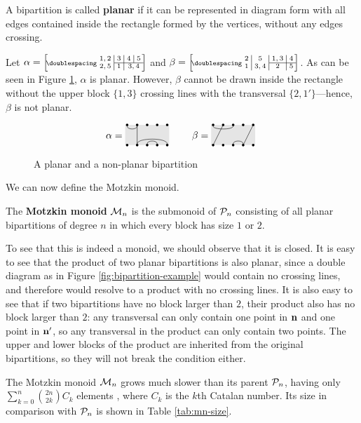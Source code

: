 \begin{definition}
  \label{def:planar}
  A bipartition is called \textbf{planar} if it can be represented in diagram
  form with all edges contained inside the rectangle formed by the vertices,
  without any edges crossing.
\end{definition}

\begin{example}
  Let $\alpha = \bipart{c|c|c|c}{2-4}{1,2 &3 &4 &5}{2,5 &1 &\mc2{c}{3,4}}$ and
  $\beta = \bipart{c|c|c|c}{3-4}{2 &5 &1,3 &4}{1 &3,4 &2 &5}$.  As can be seen
  in Figure \ref{fig:planar}, $\alpha$ is planar.  However, $\beta$ cannot be
  drawn inside the rectangle without the upper block $\{1,3\}$ crossing lines
  with the transversal $\{2, 1'\}$---hence, $\beta$ is not planar.
\end{example}

\begin{figure}[h]
  \centering
  $$\alpha = \bipartdiag{\tc12\tv22\bC25 \bc34} \qquad
  \beta = \bipartdiag{\tc13 \tv21 \tv54\bc34}$$
  \caption{A planar and a non-planar bipartition}
  \label{fig:planar}
\end{figure}

We can now define the Motzkin monoid.

\begin{definition}
  \label{def:motzkin}
  The \textbf{Motzkin monoid} $\mathcal{M}_n$ is the submonoid of $\mathcal{P}_n$ consisting
  of all planar bipartitions of degree $n$ in which every block has size $1$ or
  $2$.
\end{definition}

To see that this is indeed a monoid, we should observe that it is closed.  It is
easy to see that the product of two planar bipartitions is also planar, since a
double diagram as in Figure \ref{fig:bipartition-example} would contain no
crossing lines, and therefore would resolve to a product with no crossing lines.
It is also easy to see that if two bipartitions have no block larger than $2$,
their product also has no block larger than $2$: any transversal can only
contain one point in $\mathbf{n}$ and one point in $\mathbf{n}'$, so any transversal in the
product can only contain two points.  The upper and lower blocks of the product
are inherited from the original bipartitions, so they will not break the
condition either.

The Motzkin monoid $\mathcal{M}_n$ grows much slower than its parent $\mathcal{P}_n$, having
only $\sum_{k=0}^n \binom{2n}{2k}C_k$ elements
\cite[\href{https://oeis.org/A026945}{A026945}]{oeis}, where $C_k$ is the $k$th
Catalan number.  Its size in comparison with $\mathcal{P}_n$ is shown in Table
\ref{tab:mn-size}.

